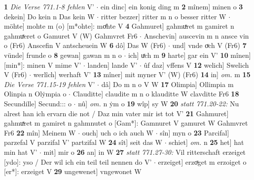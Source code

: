 \documentclass[8pt,a4paper,notitlepage]{article}
\begin{document}
\begin{table}[ht]
\begin{minipage}[t]{0.5\linewidth}
\textbf{1} \textit{Die Verse 771.1-8 fehlen} V'   $\cdot$ ein dinc] ein konig ding m \textbf{2} mînem] minen o \textbf{3} dekein] Do kein n Das kein W  $\cdot$ ritter bezzer] ritter m n o besser ritter W  $\cdot$ möhte] mohte m (o) [m*ohte]: moͤhte  V \textbf{4} Gahmuret] gahmuͯret m gamiret n gahmuͯeret o Gamuret V (W) Gahmvret Fr6  $\cdot$ Anschevin] auscevin m n ansce vin o (Fr6) Anscefin V antscheuein W \textbf{6} dô] Das W (Fr6)  $\cdot$ und] vnde oͮch V (Fr6) \textbf{7} vünde] frunde o \textbf{8} gewan] gawan m n o  $\cdot$ ich] uͯch m \textbf{9} harte] gar ein V' \textbf{10} mînen] [min*]: minen V mime V'  $\cdot$ landen] lande V'  $\cdot$ ûf daz] vffens V \textbf{12} welich] Swelich V (Fr6)  $\cdot$ werlîch] werhaft V' \textbf{13} mîner] mit myner V' (W) (Fr6) \textbf{14} in] \textit{om.} m \textbf{15} \textit{Die Verse 771.15-19 fehlen} V'   $\cdot$ dâ] Do m n o V W \textbf{17} Olimpia] Ollimpia m Olinpia n Olẏmpia o  $\cdot$ Clauditte] claudite m n o klauditte W clavditte Fr6 \textbf{18} Secundille] Secund::: o  $\cdot$ nû] \textit{om.} n ẏm o \textbf{19} wîp] sy W \textbf{20} \textit{statt 771.20-22:} Nu alrest han ich ervarn die not / Daz min vater mir ist tot V'  \textbf{21} Gahmuret] gahmuͯret m gamiret n gahmnutet o [Gam*]: Gamnuret V gamuret W Gahmvret Fr6 \textbf{22} mîn] Meinem W  $\cdot$ ouch] uch o ich auch W  $\cdot$ sîn] myn o \textbf{23} Parcifal] parzefal V parzifal V' partzifal W \textbf{24} sît] seit das W  $\cdot$ schiet] \textit{om.} n \textbf{25} het] hat min hat V'  $\cdot$ mit] mir o \textbf{26} an] in W \textbf{27} \textit{statt 771.27-30:} Vil ritterschaft erzeiget [ydo]: yso / Der wil ich ein teil teil nennen do V'   $\cdot$ erzeiget] erzoͯget m erzoiget o [er*]: erzeiget V \textbf{29} ungewenet] vngewonet W \newline
\end{minipage}
\end{table}
\newpage
\end{document}
